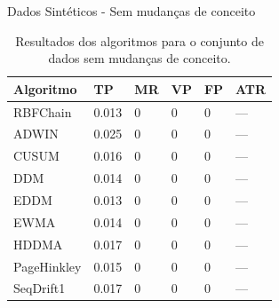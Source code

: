 \documentclass[10pt]{beamer}
\begin{document}
\begin{frame}{Dados Sintéticos -  Sem mudanças de conceito}
    \begin{table}[h]
        \centering
        \caption{Resultados dos algoritmos para o conjunto de dados sem mudanças de conceito.}
        \label{tbl:exp1}
        \begin{tabular}{llllll}

        \toprule
        Algoritmo              & TP                     & MR                     & VP                     & FP                     & ATR                    \\
        \midrule
        RBFChain               & \alert{0.013}                  & 0                      & 0                      & 0                      & ---                    \\
        ADWIN                  & 0.025                  & 0                      & 0                      & 0                      & ---                    \\
        CUSUM                  & 0.016                  & 0                      & 0                      & 0                      & ---                    \\
        DDM                    & 0.014                  & 0                      & 0                      & 0                      & ---                    \\
        EDDM                   & \alert{0.013}                  & 0                      & 0                      & 0                      & ---                    \\
        EWMA                   & 0.014                  & 0                      & 0                      & 0                      & ---                    \\
        HDDMA                  & 0.017                  & 0                      & 0                      & 0                      & ---                    \\
        PageHinkley            & 0.015                  & 0                      & 0                      & 0                      & ---                    \\
        SeqDrift1              & 0.017                  & 0                      & 0                      & 0                      & ---                    \\
        \bottomrule

        \end{tabular}
    \end{table}
\end{frame}
\end{document}
